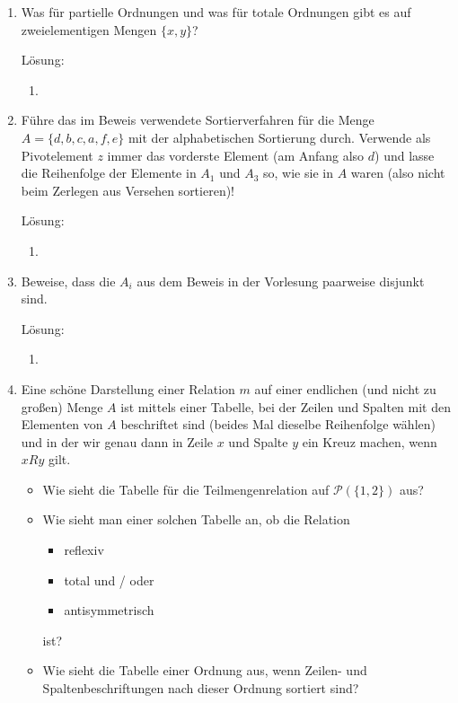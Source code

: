 \documentclass[../main.tex]{subfiles}
\begin{document}
\begin{enumerate}
	\item  Was für partielle Ordnungen und was für totale Ordnungen gibt es
	      auf zweielementigen Mengen \( \{x, y\} \)?

	      Lösung:
	      \begin{enumerate}
		      \item
	      \end{enumerate}
	\item Führe das im Beweis verwendete Sortierverfahren für die Menge \( A = \{ d,b,c,a,f,e \} \)
	      mit der alphabetischen Sortierung durch. Verwende als Pivotelement \( z \) immer
	      das vorderste Element (am Anfang also \( d \)) und lasse die Reihenfolge der
	      Elemente in \( A_1 \) und \( A_3 \) so, wie sie in \( A \) waren (also nicht beim Zerlegen aus
	      Versehen sortieren)!

	      Lösung:
	      \begin{enumerate}
		      \item
	      \end{enumerate}
	\item Beweise, dass die \( A_i \) aus dem Beweis in der Vorlesung paarweise disjunkt sind.

	      Lösung:
	      \begin{enumerate}
		      \item
	      \end{enumerate}
	\item Eine schöne Darstellung einer Relation \( m \) auf einer endlichen (und nicht zu
	      großen) Menge \( A \) ist mittels einer Tabelle, bei der Zeilen und Spalten mit den
	      Elementen von \( A \) beschriftet sind (beides Mal dieselbe Reihenfolge wählen)
	      und in der wir genau dann in Zeile \( x \) und Spalte \( y \) ein Kreuz machen, wenn
	      \( xRy \) gilt.
	      \begin{itemize}
		      \item  Wie sieht die Tabelle für die Teilmengenrelation auf \( \mathcal{P}(\{ 1, 2 \}) \) aus?
		      \item Wie sieht man einer solchen Tabelle an, ob die Relation
		            \begin{itemize}
			            \item reflexiv
			            \item total und / oder
			            \item antisymmetrisch
		            \end{itemize}
		            ist?
		      \item Wie sieht die Tabelle einer Ordnung aus, wenn Zeilen- und Spaltenbeschriftungen
		            nach dieser Ordnung sortiert sind?
	      \end{itemize}


\end{enumerate}
\end{document}
